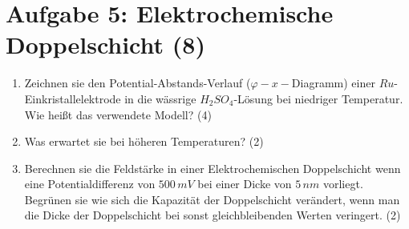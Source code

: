 \section*{Aufgabe 5: Elektrochemische Doppelschicht (8)}
\begin{enumerate}
\item Zeichnen sie den Potential-Abstands-Verlauf (\(\varphi-x-\)Diagramm) einer \(Ru\)-Einkristallelektrode
in die  wässrige \(H_2SO_4\)-Lösung bei niedriger Temperatur. Wie heißt das verwendete
Modell? (4)

\item Was erwartet sie bei höheren Temperaturen? (2)

\item Berechnen sie die Feldstärke in einer Elektrochemischen Doppelschicht wenn eine
Potentialdifferenz von \(500\, mV\) bei einer Dicke von \(5\, nm\) vorliegt. Begrünen
sie wie sich die Kapazität der Doppelschicht verändert, wenn man die Dicke der Doppelschicht
bei sonst gleichbleibenden Werten veringert. (2)

\end{enumerate}